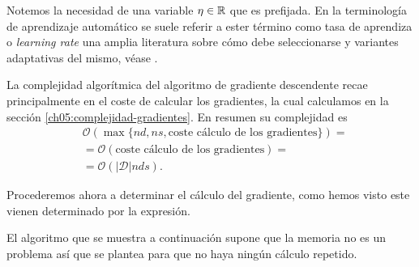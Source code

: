 Notemos la necesidad de una variable $\eta \in \mathbb{R}$ que es
 prefijada. En la terminología de aprendizaje automático 
se suele referir a ester término 
como tasa de aprendiza o \textit{learning rate}
una amplia literatura sobre cómo debe seleccionarse 
y variantes adaptativas del mismo, véase \cite{MostafaLearningFromData}. 

La complejidad algorítmica del algoritmo de gradiente 
descendente recae principalmente en el coste de calcular los gradientes, la cual calculamos en la sección \ref{ch05:complejidad-gradientes}. 
En resumen su complejidad es 
\begin{align*}
    &\mathcal{O}(
        \max\{
            n d , n s, 
            \text{coste cálculo de los gradientes}
        \}
    )
    = \\
    & = 
    \mathcal{O}(
        \text{coste cálculo de los gradientes}
    )
    =  \\
    & 
    = 
    \mathcal{O}(|\mathcal{D}| n d s).
\end{align*} 

Procederemos ahora a determinar el cálculo del gradiente, como hemos visto este vienen determinado por la expresión. 

El algoritmo que se muestra a continuación supone que la memoria no es un problema así que se plantea para que no haya ningún cálculo repetido. 


